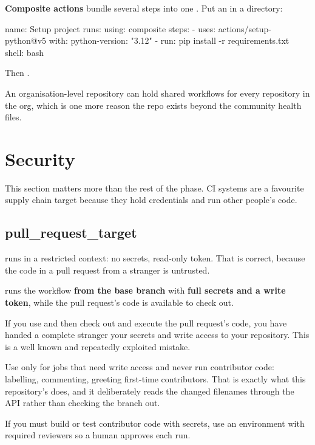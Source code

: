 \documentclass[11pt]{article}
\begin{document}
\textbf{Composite actions} bundle several steps into one . Put an
 in a directory:

\begin{terminal}
name: Setup project
runs:
  using: composite
  steps:
    - uses: actions/setup-python@v5
      with: {python-version: "3.12"}
    - run: pip install -r requirements.txt
      shell: bash
\end{terminal}

Then .

\begin{note}
An organisation-level  repository can hold shared workflows for every
repository in the org, which is one more reason the  repo exists beyond
the community health files.
\end{note}

\section{Security}

This section matters more than the rest of the phase. CI systems are a favourite
supply chain target because they hold credentials and run other people's code.

\subsection{pull\_request\_target}

\begin{trap}
 runs in a restricted context: no secrets, read-only token. That is
correct, because the code in a pull request from a stranger is untrusted.

 runs the workflow \textbf{from the base branch} with
\textbf{full secrets and a write token}, while the pull request's code is available
to check out.

If you use  and then check out and execute the pull
request's code, you have handed a complete stranger your secrets and write access to
your repository. This is a well known and repeatedly exploited mistake.

Use  only for jobs that need write access and never run
contributor code: labelling, commenting, greeting first-time contributors. That is
exactly what this repository's  does, and it deliberately reads the
changed filenames through the API rather than checking the branch out.

If you must build or test contributor code with secrets, use an environment with
required reviewers so a human approves each run.
\end{trap}
\end{document}
